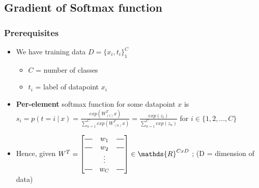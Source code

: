 \documentclass{article}
\newcommand*{\horzbar}{\rule[.5ex]{2.5ex}{0.5pt}}
\begin{document}
\subsection{Gradient of Softmax function}
\subsubsection{Prerequisites}
    \begin{itemize}
        \item We have training data $D = \{x_{i}, t_{i}\}_{1}^{C}$
            \begin{itemize}
                \item $C$ = number of classes
                \item $t_{i}$ = label of datapoint $x_{i}$
            \end{itemize}
        \item \textbf{Per-element} softmax function for some datapoint $x$ is $s_{i} = p(t=i\ | \ x) = 
                    \frac{exp(W_{(i)}^{T}x)}{\sum\limits_{n=1}^{C}exp(W_{(n)}^{T}x)} =
                    \frac{exp(z_{i})}{\sum\limits_{n=1}^{C}exp(z_{n})}
                    $ for $i \in \{1,2,...,C\}$ 
        \item Hence, given $W^{T} = \begin{bmatrix}
                                        \horzbar & w_{1} & \horzbar \\
                                        \horzbar & w_{2} & \horzbar \\
                                        & \vdots &\\
                                        \horzbar & w_{C} & \horzbar
                                    \end{bmatrix} \in \mathds{R}^{C x D}$ ; (D = dimension of data)
\end{itemize}
\end{document}
